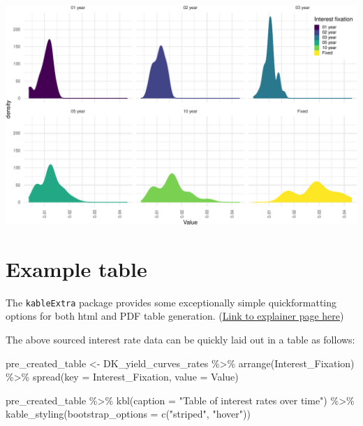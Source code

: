 \documentclass[
]{book}
\newenvironment{Shaded}{\begin{snugshade}}{\end{snugshade}}
\newcommand{\AttributeTok}[1]{\textcolor[rgb]{0.77,0.63,0.00}{#1}}
\newcommand{\FunctionTok}[1]{\textcolor[rgb]{0.00,0.00,0.00}{#1}}
\newcommand{\NormalTok}[1]{#1}
\newcommand{\OtherTok}[1]{\textcolor[rgb]{0.56,0.35,0.01}{#1}}
\newcommand{\SpecialCharTok}[1]{\textcolor[rgb]{0.00,0.00,0.00}{#1}}
\newcommand{\StringTok}[1]{\textcolor[rgb]{0.31,0.60,0.02}{#1}}
\begin{document}
\includegraphics{figures/unnamed-chunk-4-1.pdf}
\newpage

\hypertarget{example-table}{%
\section{Example table}\label{example-table}}

The \texttt{kableExtra} package provides some exceptionally simple quickformatting options for both html and PDF table generation. (\href{https://cran.r-project.org/web/packages/kableExtra/vignettes/awesome_table_in_html.html\#Overview}{Link to explainer page here})

The above sourced interest rate data can be quickly laid out in a table as follows:

\begin{Shaded}
\begin{Highlighting}[]
\NormalTok{pre\_created\_table }\OtherTok{\textless{}{-}}\NormalTok{ DK\_yield\_curves\_rates }\SpecialCharTok{\%\textgreater{}\%}
          \FunctionTok{arrange}\NormalTok{(Interest\_Fixation) }\SpecialCharTok{\%\textgreater{}\%}
          \FunctionTok{spread}\NormalTok{(}\AttributeTok{key =}\NormalTok{ Interest\_Fixation, }\AttributeTok{value =}\NormalTok{ Value)}

\NormalTok{pre\_created\_table }\SpecialCharTok{\%\textgreater{}\%}
  \FunctionTok{kbl}\NormalTok{(}\AttributeTok{caption =} \StringTok{"Table of interest rates over time"}\NormalTok{) }\SpecialCharTok{\%\textgreater{}\%}
  \FunctionTok{kable\_styling}\NormalTok{(}\AttributeTok{bootstrap\_options =} \FunctionTok{c}\NormalTok{(}\StringTok{"striped"}\NormalTok{, }\StringTok{"hover"}\NormalTok{))}
\end{Highlighting}
\end{Shaded}
\end{document}
